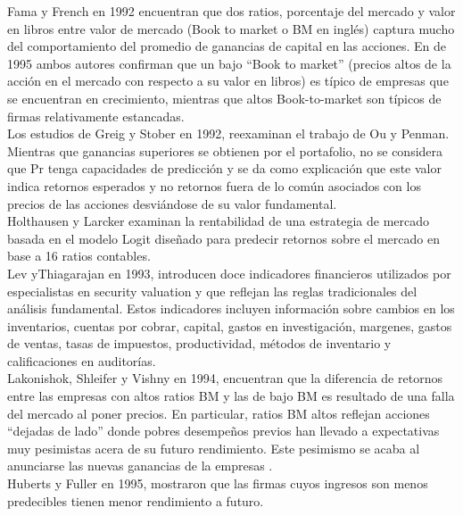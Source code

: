 Fama y French \cite{Fama1992} en 1992 encuentran que dos ratios, porcentaje del mercado y valor en libros entre valor de mercado (Book to market o BM en inglés) captura mucho del comportamiento del promedio de ganancias de capital en las acciones. En \cite{Fama1995} de 1995 ambos autores confirman que un bajo “Book to market” (precios altos de la acción en el mercado con respecto a su valor en libros) es típico de empresas que se encuentran en crecimiento, mientras que altos Book-to-market son típicos de firmas relativamente estancadas.\\

Los estudios de Greig y Stober \cite{Greig1992} en 1992, reexaminan el trabajo de Ou y Penman. Mientras que ganancias superiores se obtienen por el portafolio, no se considera que Pr tenga capacidades de predicción y se da como explicación que este valor indica retornos esperados y no retornos fuera de lo común asociados con los precios de las acciones desviándose de su valor fundamental.\\

Holthausen y Larcker \cite{Holthausen1992} examinan la rentabilidad de una estrategia de mercado basada en el modelo Logit diseñado para predecir retornos sobre el mercado en base a 16 ratios contables.\\

Lev yThiagarajan \cite{Lev1993} en 1993, introducen doce indicadores financieros utilizados por especialistas en security valuation y que reflejan las reglas tradicionales del análisis fundamental. Estos indicadores incluyen  información sobre cambios en los inventarios, cuentas por cobrar, capital, gastos en investigación, margenes,  gastos de ventas, tasas de impuestos, productividad, métodos de inventario y calificaciones en auditorías. \\

Lakonishok, Shleifer y Vishny \cite{Lakonishok1994} en 1994, encuentran que la diferencia de retornos entre las empresas con altos ratios BM y las de bajo BM es resultado de una falla del mercado al poner precios. En particular, ratios BM altos reflejan acciones “dejadas de lado” donde pobres desempeños previos han llevado a expectativas muy pesimistas acera de su futuro rendimiento. Este pesimismo se acaba  al anunciarse las nuevas ganancias de la empresas \cite{LaPorta1996}.\\

Huberts y Fuller \cite{Huberts1995} en 1995, mostraron que las firmas cuyos ingresos son menos predecibles tienen menor rendimiento a futuro.\\


